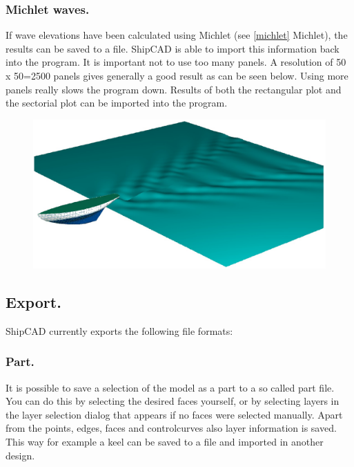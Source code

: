 \documentclass[12pt]{article}
\begin{document}
\subsubsection{Michlet waves.} \label{michlet-waves}
If wave elevations have been calculated using Michlet
(see \ref{michlet} Michlet),
the results can be saved to a file. ShipCAD is able to import this
information back into the program. It is important not to use too many
panels. A resolution of 50 x 50=2500 panels gives generally a good
result as can be seen below. Using more panels really slows the
program down. Results of both the rectangular plot and the sectorial
plot can be imported into the program.

\begin{figure}[h]
        \centering
        \includegraphics[width=15cm,natwidth=1182,natheight=601]{filemichlet.png}
        \caption{}
        \label{fig:filemichlet}
\end{figure}

\subsection{Export.}
ShipCAD currently exports the following file formats:

\subsubsection{Part.} \label{part}
It is possible to save a selection of the model as a part to a so
called part file. You can do this by selecting the desired faces
yourself, or by selecting layers in the layer selection dialog that
appears if no faces were selected manually. Apart from the points,
edges, faces and controlcurves also layer information is saved. This
way for example a keel can be saved to a file and imported in another
design.
\end{document}
